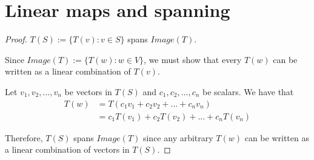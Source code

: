\section{Linear maps and spanning}
\begin{proof} $T(S) := \{T(v):v \in S\}$ spans $Image(T)$.\gap

    Since $Image(T) := \{T(w):w \in V\}$, 
    we must show that every $T(w)$ 
    can be written as a linear combination of $T(v)$.\gap

    Let $v_1,v_2,...,v_n$ be vectors in $T(S)$
    and $c_1,c_2,...,c_n$ be scalars.
    We have that
    \begin{align*}
        T(w) 
        &= T(c_1v_1 + c_2v_2 + ... + c_nv_n)\\ 
        &= c_1T(v_1) + c_2T(v_2) + ... + c_nT(v_n)
    \end{align*}

    Therefore, $T(S)$ spans $Image(T)$ 
    since any arbitrary $T(w)$ can be written as
    a linear combination of vectors in $T(S)$.
\end{proof}